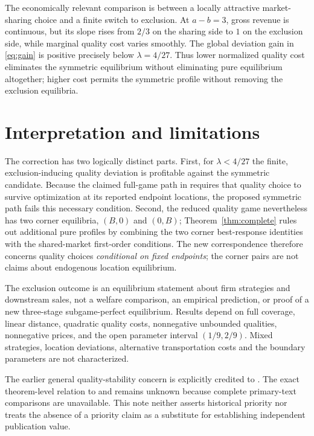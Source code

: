 \documentclass[11pt]{article}
\begin{document}
The economically relevant comparison is between
a locally attractive market-sharing choice and
a finite switch to exclusion. At $a-b=3$,
gross revenue is continuous, but its slope
rises from $2/3$ on the sharing side to $1$
on the exclusion side, while marginal quality
cost varies smoothly. The global deviation
gain in \eqref{eq:gain} is positive precisely
below $\lambda=4/27$. Thus lower normalized
quality cost eliminates the symmetric equilibrium
without eliminating pure equilibrium altogether;
higher cost permits the symmetric profile
without removing the exclusion equilibria.

\section{Interpretation and limitations}\label{sec:discussion}
The correction has two logically distinct parts.
First, for $\lambda<4/27$ the finite, exclusion-inducing
quality deviation is profitable against the symmetric
candidate. Because the claimed full-game path in
\citet[Theorem~2]{Economides1989} requires that
quality choice to survive optimization at its
reported endpoint locations, the proposed
symmetric path fails this necessary condition.
Second, the reduced quality game nevertheless
has two corner equilibria, $(B,0)$ and $(0,B)$;
Theorem~\ref{thm:complete} rules out additional
pure profiles by combining the two corner
best-response identities with the shared-market
first-order conditions. The new correspondence
therefore concerns quality choices \emph{conditional
on fixed endpoints}; the corner pairs are not
claims about endogenous location equilibrium.

The exclusion outcome is an equilibrium
statement about firm strategies and downstream
sales, not a welfare comparison, an empirical
prediction, or proof of a new three-stage
subgame-perfect equilibrium. Results depend on
full coverage, linear distance, quadratic
quality costs, nonnegative unbounded qualities,
nonnegative prices, and the open parameter
interval $(1/9,2/9)$. Mixed strategies,
location deviations, alternative transportation
costs and the boundary parameters are not
characterized.

The earlier general quality-stability concern
is explicitly credited to \citet{Bunte1997}.
The exact theorem-level relation to
\citet{Bunte1995} and \citet{Sorenson1995}
remains unknown because complete primary-text
comparisons are unavailable. This note neither
asserts historical priority nor treats the
absence of a priority claim as a substitute
for establishing independent publication value.
\end{document}
